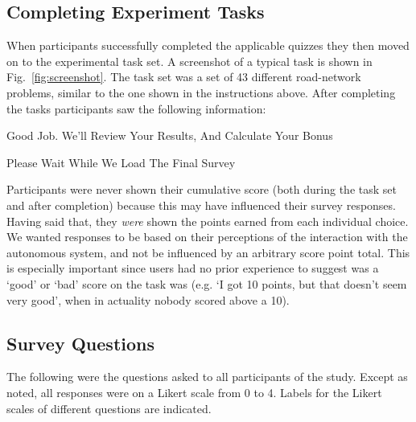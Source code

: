 \subsection{Completing Experiment Tasks} \label{sec:task_set_explanation}

When participants successfully completed the applicable quizzes they then moved on to the experimental task set. A screenshot of a typical task is shown in Fig.~\ref{fig:screenshot}. The task set was a set of 43 different road-network problems, similar to the one shown in the instructions above. After completing the tasks participants saw the following information:

\begin{quoting}
    Good Job. We'll Review Your Results, And Calculate Your Bonus

    Please Wait While We Load The Final Survey
\end{quoting}

Participants were never shown their cumulative score (both during the task set and after completion) because this may have influenced their survey responses. Having said that, they \emph{were} shown the points earned from each individual choice. We wanted responses to be based on their perceptions of the interaction with the autonomous system, and not be influenced by an arbitrary score point total. This is especially important since users had no prior experience to suggest was a `good' or `bad' score on the task was (e.g. `I got 10 points, but that doesn't seem very good', when in actuality nobody scored above a 10).

\subsection{Survey Questions} \label{sec:survey_questions}
The following were the questions asked to all participants of the study. Except as noted, all responses were on a Likert scale from 0 to 4. Labels for the Likert scales of different questions are indicated.


